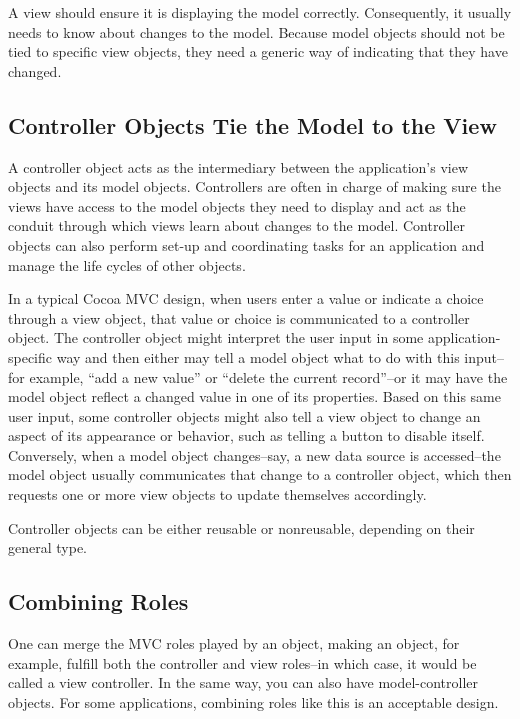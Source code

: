 A view should ensure it is displaying the model correctly. Consequently, it
usually needs to know about changes to the model. Because model objects should
not be tied to specific view objects, they need a generic way of indicating that
they have changed.

\subsection{Controller Objects Tie the Model to the View}

A controller object acts as the intermediary between the application's view
objects and its model objects. Controllers are often in charge of making sure
the views have access to the model objects they need to display and act as the
conduit through which views learn about changes to the model. Controller objects
can also perform set-up and coordinating tasks for an application and manage the
life cycles of other objects.

In a typical Cocoa MVC design, when users enter a value or indicate a choice
through a view object, that value or choice is communicated to a controller
object. The controller object might interpret the user input in some
application-specific way and then either may tell a model object what to do with
this input--for example, ``add a new value'' or ``delete the current record''--or
it may have the model object reflect a changed value in one of its properties.
Based on this same user input, some controller objects might also tell a view
object to change an aspect of its appearance or behavior, such as telling a
button to disable itself. Conversely, when a model object changes--say, a new
data source is accessed--the model object usually communicates that change to a
controller object, which then requests one or more view objects to update
themselves accordingly.

Controller objects can be either reusable or nonreusable, depending on their
general type.

\subsection{Combining Roles}

One can merge the MVC roles played by an object, making an object, for example,
fulfill both the controller and view roles--in which case, it would be called a
view controller. In the same way, you can also have model-controller objects.
For some applications, combining roles like this is an acceptable design.

